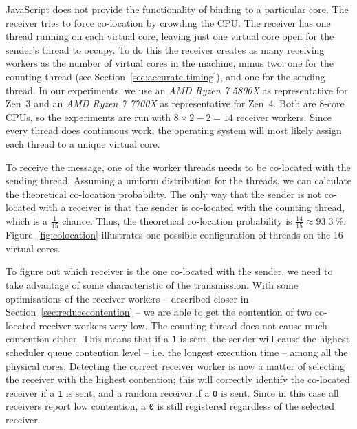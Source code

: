 \documentclass[11pt,
  titlepage=false,
  parskip=half,      %
]{scrreprt}
\begin{document}
JavaScript does not provide the functionality of binding to a particular core.
The receiver tries to force co-location by crowding the CPU.
The receiver has one thread running on each virtual core,
leaving just one virtual core open for the sender's thread to occupy.
To do this the receiver creates as many receiving workers as the number of virtual cores in the machine, minus two:
one for the counting thread (see Section~\ref{sec:accurate-timing}), and one for the sending thread.
In our experiments, we use an \textit{AMD Ryzen 7 5800X} as representative for Zen~3 and an \textit{AMD Ryzen 7 7700X} as representative for Zen~4.
Both are 8-core CPUs, so the experiments are run with $8 \times 2 - 2 = 14$ receiver workers.
Since every thread does continuous work, the operating system will most likely assign each thread to a unique virtual core.

To receive the message, one of the worker threads needs to be co-located with the sending thread.
Assuming a uniform distribution for the threads, we can calculate the theoretical co-location probability.
The only way that the sender is not co-located with a receiver is that the sender is co-located with the counting thread,
which is a $\frac{1}{15}$ chance.
Thus, the theoretical co-location probability is $\frac{14}{15} \approx 93.3~\%$.
Figure~\ref{fig:colocation} illustrates one possible configuration of threads on the 16 virtual cores.

To figure out which receiver is the one co-located with the sender,
we need to take advantage of some characteristic of the transmission.
With some optimisations of the receiver workers -- described closer in Section~\ref{sec:reducecontention} --
we are able to get the contention of two co-located receiver workers very low.
The counting thread does not cause much contention either.
This means that if a \texttt{1} is sent, the sender will cause the highest scheduler queue contention level -- i.e. the longest execution time --
among all the physical cores.
Detecting the correct receiver worker is now a matter of selecting the receiver with the highest contention;
this will correctly identify the co-located receiver if a \texttt{1} is sent, and a random receiver if a \texttt{0} is sent.
Since in this case all receivers report low contention, a \texttt{0} is still registered regardless of the selected receiver.
\end{document}
